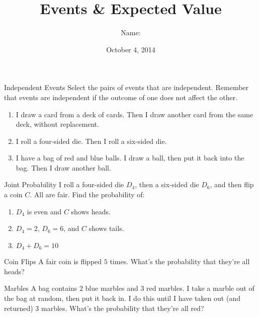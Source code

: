 \documentclass[12pt,letterpaper]{article}
\title{Events \& Expected Value}
\author{Name: \underline{\hspace{5cm}}}
\date{October 4, 2014}
\begin{document}
\maketitle

\thispagestyle{empty}

\begin{problem}{Independent Events}
 Select the pairs of events that are independent. Remember that events are
 independent if the outcome of one does not affect the other.

 \begin{enumerate}[\hspace{.5cm}a.]
  \item I draw a card from a deck of cards. Then I draw another card from the
  same deck, without replacement.
  \item I roll a four-sided die. Then I roll a six-sided die.
  \item I have a bag of red and blue balls. I draw a ball, then put it back into
  the bag. Then I draw another ball.
 \end{enumerate}
\end{problem}

\begin{problem}{Joint Probability}
I roll a four-sided die $D_4$, then a six-sided die $D_6$, and then flip a coin
$C$. All are fair. Find the probability of:

\begin{enumerate}[\hspace{.5cm}a.]
\item $D_4$ is even and $C$ shows heads.
\item $D_4=2$, $D_6=6$, and $C$ shows tails.
\item $D_4 + D_6 = 10$
\end{enumerate}
\end{problem}

\begin{problem}{Coin Flips}
A fair coin is flipped $5$ times. What's the probability that they're all heads?
\end{problem}

\begin{problem}{Marbles}
A bag contains $2$ blue marbles and $3$ red marbles. I take a marble out of the
bag at random, then put it back in. I do this until I have taken out (and
returned) $3$ marbles. What's the probability that they're all red?
\end{problem}
\end{document}
